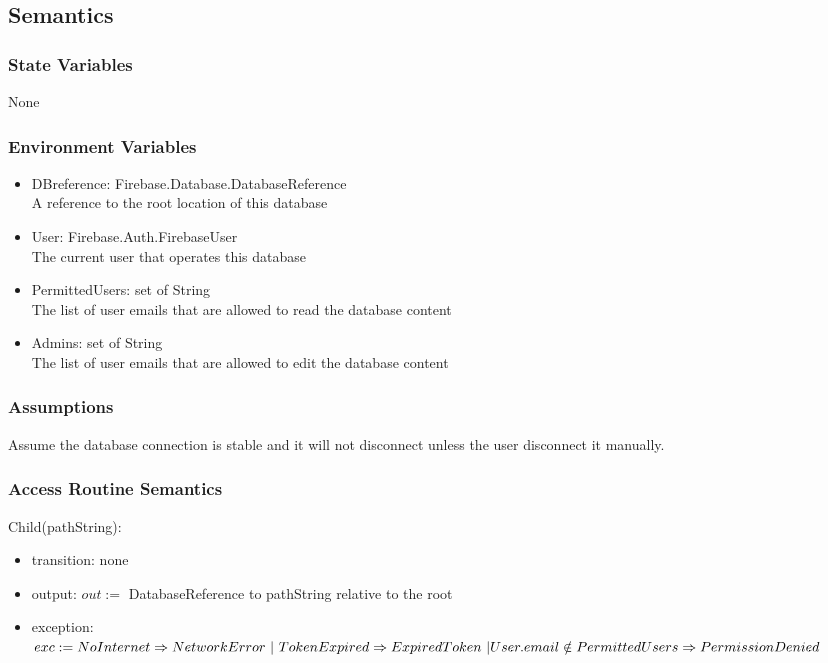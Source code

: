 \documentclass[12pt, titlepage]{article}
\begin{document}
\subsection{Semantics}

\subsubsection{State Variables}

None

\subsubsection{Environment Variables}

\begin{itemize}
\item DBreference: Firebase.Database.DatabaseReference\\
A reference to the root location of this database
\item User: Firebase.Auth.FirebaseUser\\
The current user that operates this database
\item PermittedUsers: set of String\\
The list of user emails that are allowed to read the database content
\item Admins: set of String\\
The list of user emails that are allowed to edit the database content
\end{itemize}


\subsubsection{Assumptions}

Assume the database connection is stable and it will not disconnect unless the user disconnect it manually.

\subsubsection{Access Routine Semantics}

\noindent Child(pathString):
\begin{itemize}
\item transition: none 
\item output: $out :=$ DatabaseReference to pathString relative to the root
\item exception: $exc := NoInternet \Rightarrow NetworkError\ | \ TokenExpired \Rightarrow ExpiredToken\ | \\ User.email \notin PermittedUsers \Rightarrow PermissionDenied$
\end{itemize}
\end{document}
